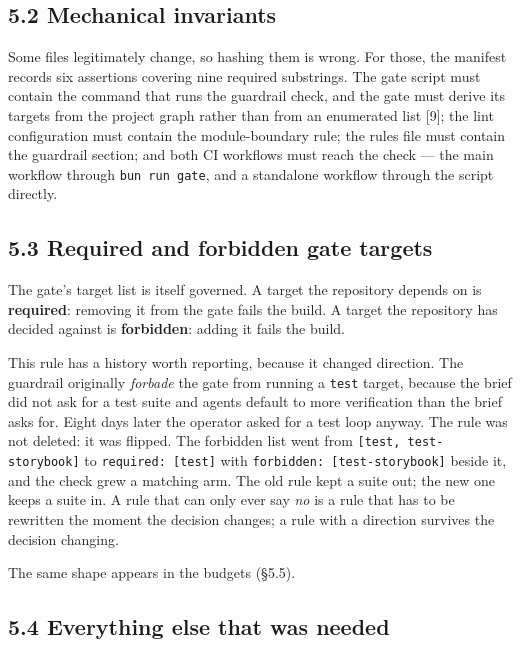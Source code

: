 \documentclass[11pt,a4paper]{article}
\begin{document}
\subsection*{5.2 Mechanical invariants}

Some files legitimately change, so hashing them is wrong. For those, the manifest records six assertions covering nine required substrings. The gate script must contain the command that runs the guardrail check, and the gate must derive its targets from the project graph rather than from an enumerated list [9]; the lint configuration must contain the module-boundary rule; the rules file must contain the guardrail section; and both CI workflows must reach the check --- the main workflow through \texttt{bun run gate}, and a standalone workflow through the script directly.

\subsection*{5.3 Required and forbidden gate targets}

The gate's target list is itself governed. A target the repository depends on is \textbf{required}: removing it from the gate fails the build. A target the repository has decided against is \textbf{forbidden}: adding it fails the build.

This rule has a history worth reporting, because it changed direction. The guardrail originally \emph{forbade} the gate from running a \texttt{test} target, because the brief did not ask for a test suite and agents default to more verification than the brief asks for. Eight days later the operator asked for a test loop anyway. The rule was not deleted: it was flipped. The forbidden list went from \texttt{[\textquotedbl{}test\textquotedbl{}, \textquotedbl{}test-storybook\textquotedbl{}]} to \texttt{required: [\textquotedbl{}test\textquotedbl{}]} with \texttt{forbidden: [\textquotedbl{}test-storybook\textquotedbl{}]} beside it, and the check grew a matching arm. The old rule kept a suite out; the new one keeps a suite in. A rule that can only ever say \emph{no} is a rule that has to be rewritten the moment the decision changes; a rule with a direction survives the decision changing.

The same shape appears in the budgets (\S{}5.5).

\subsection*{5.4 Everything else that was needed}
\end{document}
